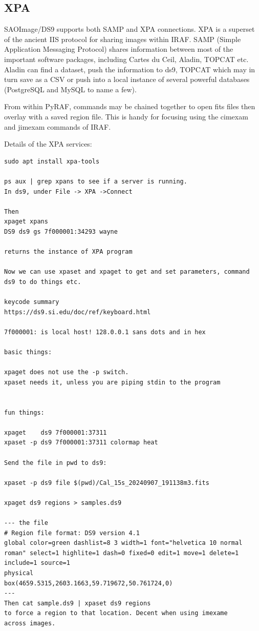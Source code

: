 \renewcommand{\footerfilename}{XPA.tex}

\subsection{XPA}  \label{sec:XPA}

SAOImage/DS9 supports both SAMP and XPA connections. XPA is a
superset of the ancient IIS protocol for sharing images within IRAF.
SAMP (Simple Application Messaging Protocol) shares information
between most of the important software packages, including Cartes
du Ceil, Aladin, TOPCAT etc. Aladin can find a dataset, push the
information to ds9, TOPCAT which may in turn save as a CSV or
push into a local instance of several powerful databases (PostgreSQL
and MySQL to name a few). 

From within PyRAF, commands may be chained together to open fits files
then overlay with a saved region file. This is handy for focusing
using the cimexam and jimexam commands of IRAF.

Details of the XPA services:

\begingroup \fontsize{10pt}{10pt}
\selectfont
\begin{verbatim} 
sudo apt install xpa-tools

ps aux | grep xpans to see if a server is running.
In ds9, under File -> XPA ->Connect

Then 
xpaget xpans
DS9 ds9 gs 7f000001:34293 wayne

returns the instance of XPA program

Now we can use xpaset and xpaget to get and set parameters, command
ds9 to do things etc.

keycode summary
https://ds9.si.edu/doc/ref/keyboard.html

7f000001: is local host! 128.0.0.1 sans dots and in hex

basic things:

xpaget does not use the -p switch.
xpaset needs it, unless you are piping stdin to the program


fun things:

xpaget    ds9 7f000001:37311 
xpaset -p ds9 7f000001:37311 colormap heat

Send the file in pwd to ds9:

xpaset -p ds9 file $(pwd)/Cal_15s_20240907_191138m3.fits

xpaget ds9 regions > samples.ds9

--- the file
# Region file format: DS9 version 4.1
global color=green dashlist=8 3 width=1 font="helvetica 10 normal roman" select=1 highlite=1 dash=0 fixed=0 edit=1 move=1 delete=1 include=1 source=1
physical
box(4659.5315,2603.1663,59.719672,50.761724,0)
---
Then cat sample.ds9 | xpaset ds9 regions
to force a region to that location. Decent when using imexame
across images.

\end{verbatim}
\endgroup
